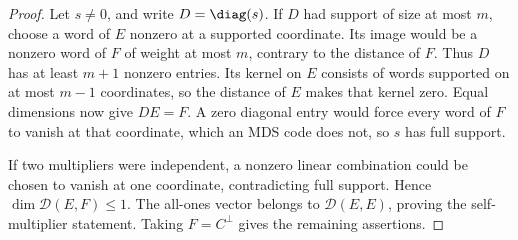 \begin{proof}
Let \(s\ne0\), and write \(D=\diag(s)\).  If \(D\) had support of size at
most \(m\), choose a word of \(E\) nonzero at a supported coordinate.
Its image would be a nonzero word of \(F\) of weight at most \(m\),
contrary to the distance of \(F\).  Thus \(D\) has at least \(m+1\)
nonzero entries.  Its kernel on \(E\) consists of words supported on at
most \(m-1\) coordinates, so the distance of \(E\) makes that kernel
zero.  Equal dimensions now give \(DE=F\).  A zero diagonal entry would
force every word of \(F\) to vanish at that coordinate, which an MDS code
does not, so \(s\) has full support.

If two multipliers were independent, a nonzero linear combination could
be chosen to vanish at one coordinate, contradicting full support.
Hence \(\dim\mathcal D(E,F)\leq1\).  The all-ones vector belongs to
\(\mathcal D(E,E)\), proving the self-multiplier statement.  Taking
\(F=C^\perp\) gives the remaining assertions.
\end{proof}

